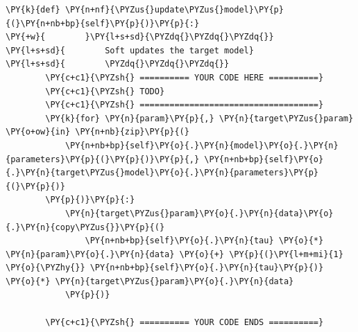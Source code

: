 \documentclass{article}
\begin{document}
\begin{Verbatim}[commandchars=\\\{\}]
    \PY{k}{def} \PY{n+nf}{\PYZus{}update\PYZus{}model}\PY{p}{(}\PY{n+nb+bp}{self}\PY{p}{)}\PY{p}{:}
\PY{+w}{        }\PY{l+s+sd}{\PYZdq{}\PYZdq{}\PYZdq{}}
\PY{l+s+sd}{        Soft updates the target model}
\PY{l+s+sd}{        \PYZdq{}\PYZdq{}\PYZdq{}}
        \PY{c+c1}{\PYZsh{} ========== YOUR CODE HERE ==========}
        \PY{c+c1}{\PYZsh{} TODO}
        \PY{c+c1}{\PYZsh{} ====================================}
        \PY{k}{for} \PY{n}{param}\PY{p}{,} \PY{n}{target\PYZus{}param} \PY{o+ow}{in} \PY{n+nb}{zip}\PY{p}{(}
            \PY{n+nb+bp}{self}\PY{o}{.}\PY{n}{model}\PY{o}{.}\PY{n}{parameters}\PY{p}{(}\PY{p}{)}\PY{p}{,} \PY{n+nb+bp}{self}\PY{o}{.}\PY{n}{target\PYZus{}model}\PY{o}{.}\PY{n}{parameters}\PY{p}{(}\PY{p}{)}
        \PY{p}{)}\PY{p}{:}
            \PY{n}{target\PYZus{}param}\PY{o}{.}\PY{n}{data}\PY{o}{.}\PY{n}{copy\PYZus{}}\PY{p}{(}
                \PY{n+nb+bp}{self}\PY{o}{.}\PY{n}{tau} \PY{o}{*} \PY{n}{param}\PY{o}{.}\PY{n}{data} \PY{o}{+} \PY{p}{(}\PY{l+m+mi}{1} \PY{o}{\PYZhy{}} \PY{n+nb+bp}{self}\PY{o}{.}\PY{n}{tau}\PY{p}{)} \PY{o}{*} \PY{n}{target\PYZus{}param}\PY{o}{.}\PY{n}{data}
            \PY{p}{)}

        \PY{c+c1}{\PYZsh{} ========== YOUR CODE ENDS ==========}
\end{Verbatim}

\newpage
\end{document}
